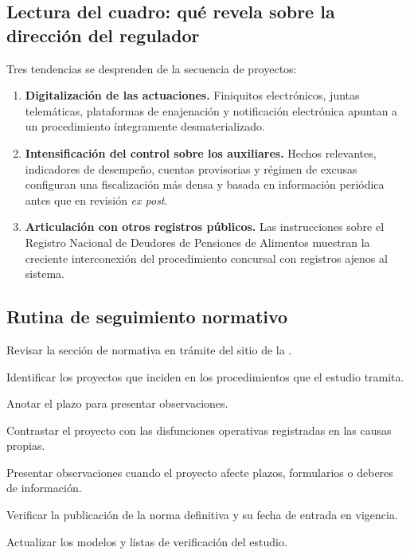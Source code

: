 
\subsection{Lectura del cuadro: qué revela sobre la dirección del regulador}

Tres tendencias se desprenden de la secuencia de proyectos:

\begin{enumerate}
  \item \textbf{Digitalización de las actuaciones.} Finiquitos electrónicos, juntas
  telemáticas, plataformas de enajenación y notificación electrónica apuntan a un
  procedimiento íntegramente desmaterializado.

  \item \textbf{Intensificación del control sobre los auxiliares.} Hechos relevantes,
  indicadores de desempeño, cuentas provisorias y régimen de excusas configuran una
  fiscalización más densa y basada en información periódica antes que en revisión
  \emph{ex post}.

  \item \textbf{Articulación con otros registros públicos.} Las instrucciones sobre el
  Registro Nacional de Deudores de Pensiones de Alimentos muestran la creciente
  interconexión del procedimiento concursal con registros ajenos al sistema.
\end{enumerate}

\bloquePractico

\subsection{Rutina de seguimiento normativo}

\begin{checklist}
  \item Revisar la sección de normativa en trámite del sitio de la \superir{}.
  \item Identificar los proyectos que inciden en los procedimientos que el estudio tramita.
  \item Anotar el plazo para presentar observaciones.
  \item Contrastar el proyecto con las disfunciones operativas registradas en las causas
  propias.
  \item Presentar observaciones cuando el proyecto afecte plazos, formularios o deberes
  de información.
  \item Verificar la publicación de la norma definitiva y su fecha de entrada en vigencia.
  \item Actualizar los modelos y listas de verificación del estudio.
\end{checklist}

